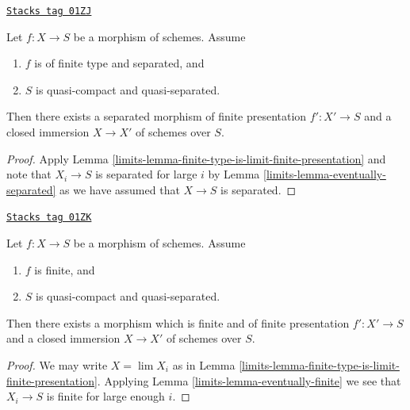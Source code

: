 \begin{proposition}
\label{limits-proposition-separated-closed-in-finite-presentation}
\href{https://stacks.math.columbia.edu/tag/01ZJ}{\texttt{Stacks tag 01ZJ}}

Let $f : X \to S$ be a morphism of schemes. Assume
\begin{enumerate}
\item $f$ is of finite type and separated, and
\item $S$ is quasi-compact and quasi-separated.
\end{enumerate}
Then there exists a separated morphism of finite presentation
$f' : X' \to S$ and a closed immersion $X \to X'$ of schemes over $S$.
\end{proposition}

\begin{proof}

Apply Lemma \ref{limits-lemma-finite-type-is-limit-finite-presentation}
and note that $X_i \to S$ is separated for
large $i$ by Lemma \ref{limits-lemma-eventually-separated} as we have
assumed that $X \to S$ is separated.
\end{proof}

\begin{lemma}
\label{limits-lemma-finite-closed-in-finite-finite-presentation}
\href{https://stacks.math.columbia.edu/tag/01ZK}{\texttt{Stacks tag 01ZK}}

Let $f : X \to S$ be a morphism of schemes. Assume
\begin{enumerate}
\item $f$ is finite, and
\item $S$ is quasi-compact and quasi-separated.
\end{enumerate}
Then there exists a morphism which is finite and of finite presentation
$f' : X' \to S$ and a closed immersion $X \to X'$ of schemes over $S$.
\end{lemma}

\begin{proof}

We may write $X = \lim X_i$ as in
Lemma \ref{limits-lemma-finite-type-is-limit-finite-presentation}.
Applying Lemma \ref{limits-lemma-eventually-finite} we see that $X_i \to S$
is finite for large enough $i$.
\end{proof}

